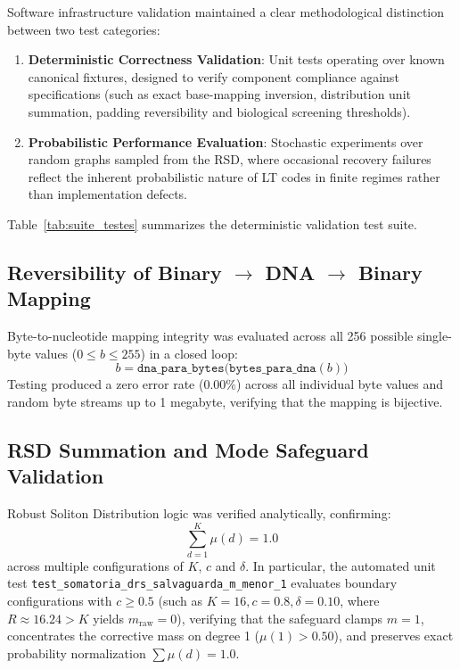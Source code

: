 Software infrastructure validation maintained a clear methodological distinction between two test categories:
\begin{enumerate}
    \item \textbf{Deterministic Correctness Validation}: Unit tests operating over known canonical fixtures, designed to verify component compliance against specifications (such as exact base-mapping inversion, distribution unit summation, padding reversibility and biological screening thresholds).
    \item \textbf{Probabilistic Performance Evaluation}: Stochastic experiments over random graphs sampled from the RSD, where occasional recovery failures reflect the inherent probabilistic nature of LT codes in finite regimes rather than implementation defects.
\end{enumerate}

Table~\ref{tab:suite_testes} summarizes the deterministic validation test suite.

\subsection{Reversibility of Binary $\to$ DNA $\to$ Binary Mapping}

Byte-to-nucleotide mapping integrity was evaluated across all 256 possible single-byte values ($0 \le b \le 255$) in a closed loop:
\begin{equation}
    b = \texttt{dna\_para\_bytes}\big(\texttt{bytes\_para\_dna}(b)\big)
\end{equation}
Testing produced a zero error rate ($0.00\%$) across all individual byte values and random byte streams up to 1 megabyte, verifying that the mapping is bijective.

\subsection{RSD Summation and Mode Safeguard Validation}

Robust Soliton Distribution logic was verified analytically, confirming:
\begin{equation}
    \sum_{d=1}^{K} \mu(d) = 1.0
\end{equation}
across multiple configurations of $K$, $c$ and $\delta$. In particular, the automated unit test \texttt{test\_somatoria\_drs\_salvaguarda\_m\_menor\_1} evaluates boundary configurations with $c \ge 0.5$ (such as $K=16, c=0.8, \delta=0.10$, where $R \approx 16.24 > K$ yields $m_{\text{raw}} = 0$), verifying that the safeguard clamps $m = 1$, concentrates the corrective mass on degree 1 ($\mu(1) > 0.50$), and preserves exact probability normalization $\sum \mu(d) = 1.0$.

